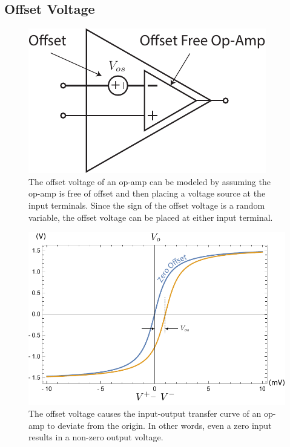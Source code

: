 \subsection{Offset Voltage}
\begin{figure}[tb]
\centering
\includegraphics[scale=1]{opamp_offset}
\caption{The offset voltage of an op-amp can be modeled by assuming the op-amp is free of offset and then placing a voltage source at the input terminals.  Since the sign of the offset voltage is a random variable, the offset voltage can be placed at either input terminal.}
\label{fig:opamp_offset}
\end{figure}
\begin{figure}[tb]
\centering
\includegraphics[width=.75\columnwidth]{opamp_offset_plot}
\caption{The offset voltage causes the input-output transfer curve of an op-amp to deviate from the origin.  In other words, even a zero input results in a non-zero output voltage.}
\label{fig:opamp_offset_plot}
\end{figure}
